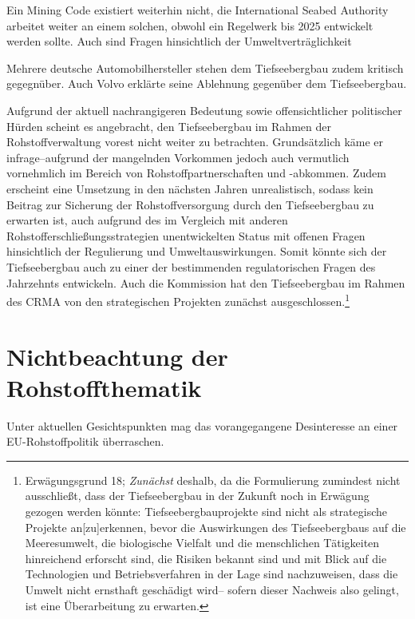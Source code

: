 \documentclass[12pt,a4paper,oneside]{book} %
\begin{document}
Ein Mining Code existiert weiterhin nicht, die International Seabed Authority arbeitet weiter an einem solchen, obwohl ein Regelwerk bis 2025 entwickelt werden sollte.\autocite{https://www.zeit.de/wissen/umwelt/2023-07/tiefseebergbau-internationale-meeresbodenbehoerde-sitzung-manganknollen} Auch sind Fragen hinsichtlich der Umweltverträglichkeit

Mehrere deutsche Automobilhersteller stehen dem Tiefseebergbau zudem kritisch gegegnüber. Auch Volvo erklärte seine Ablehnung gegenüber dem Tiefseebergbau.\autocite{https://www.volvocars-news.ch/dna-of-volvo/volvo-cars-lehnt-tiefseebergbau-ab/}

Aufgrund der aktuell nachrangigeren Bedeutung sowie offensichtlicher politischer Hürden scheint es angebracht, den Tiefseebergbau im Rahmen der Rohstoffverwaltung vorest nicht weiter zu betrachten. Grundsätzlich käme er infrage--aufgrund der mangelnden Vorkommen jedoch auch vermutlich vornehmlich im Bereich von Rohstoffpartnerschaften und -abkommen. Zudem erscheint eine Umsetzung in den nächsten Jahren unrealistisch, sodass kein Beitrag zur Sicherung der Rohstoffversorgung durch den Tiefseebergbau zu erwarten ist, auch aufgrund des im Vergleich mit anderen Rohstofferschließungsstrategien unentwickelten Status mit offenen Fragen hinsichtlich der Regulierung und Umweltauswirkungen.\autocite{https://www.wri.org/insights/deep-sea-mining-explained} Somit könnte sich der Tiefseebergbau auch zu einer der bestimmenden regulatorischen Fragen des Jahrzehnts entwickeln.\autocite{https://media.licdn.com/dms/document/media/v2/D4D1FAQEAIHCav-AneQ/feedshare-document-url-metadata-scrapper-pdf/B4DZxX1ZLwIoA4-/0/1771000145057?e=1771837200&v=beta&t=MitIN7QLZoAnNvyYxv_Ut-RXUJucvGrtLlfxS0L2FQg, S, 11} Auch die Kommission hat den Tiefseebergbau im Rahmen des CRMA von den strategischen Projekten zunächst ausgeschlossen.\footnote{Erwägungsgrund 18; \textit{Zunächst} deshalb, da die Formulierung zumindest nicht ausschließt, dass der Tiefseebergbau in der Zukunft noch in Erwägung gezogen werden könnte: Tiefseebergbauprojekte sind \glqq nicht als strategische Projekte an[zu]erkennen, bevor die Auswirkungen des Tiefseebergbaus auf die Meeresumwelt, die biologische Vielfalt und die menschlichen Tätigkeiten hinreichend erforscht sind, die Risiken bekannt sind und mit Blick auf die Technologien und Betriebsverfahren in der Lage sind nachzuweisen, dass die Umwelt nicht ernsthaft geschädigt wird\grqq -- sofern dieser Nachweis also gelingt, ist eine Überarbeitung zu erwarten.}

\section{Nichtbeachtung der Rohstoffthematik}
Unter aktuellen Gesichtspunkten mag das vorangegangene Desinteresse an einer EU-Rohstoffpolitik überraschen.
\end{document}
